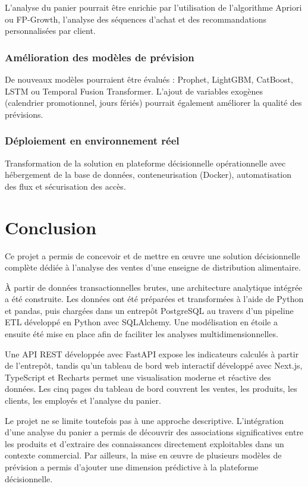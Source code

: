 \documentclass[12pt,a4paper,twoside]{report}
\begin{document}
L'analyse du panier pourrait être enrichie par l'utilisation de l'algorithme Apriori ou FP-Growth, l'analyse des séquences d'achat et des recommandations personnalisées par client.

\subsection{Amélioration des modèles de prévision}

De nouveaux modèles pourraient être évalués : Prophet, LightGBM, CatBoost, LSTM ou Temporal Fusion Transformer. L'ajout de variables exogènes (calendrier promotionnel, jours fériés) pourrait également améliorer la qualité des prévisions.

\subsection{Déploiement en environnement réel}

Transformation de la solution en plateforme décisionnelle opérationnelle avec hébergement de la base de données, conteneurisation (Docker), automatisation des flux et sécurisation des accès.

\chapter{Conclusion}

Ce projet a permis de concevoir et de mettre en œuvre une solution décisionnelle complète dédiée à l'analyse des ventes d'une enseigne de distribution alimentaire.

À partir de données transactionnelles brutes, une architecture analytique intégrée a été construite. Les données ont été préparées et transformées à l'aide de Python et pandas, puis chargées dans un entrepôt PostgreSQL au travers d'un pipeline ETL développé en Python avec SQLAlchemy. Une modélisation en étoile a ensuite été mise en place afin de faciliter les analyses multidimensionnelles.

Une API REST développée avec FastAPI expose les indicateurs calculés à partir de l'entrepôt, tandis qu'un tableau de bord web interactif développé avec Next.js, TypeScript et Recharts permet une visualisation moderne et réactive des données. Les cinq pages du tableau de bord couvrent les ventes, les produits, les clients, les employés et l'analyse du panier.

Le projet ne se limite toutefois pas à une approche descriptive. L'intégration d'une analyse du panier a permis de découvrir des associations significatives entre les produits et d'extraire des connaissances directement exploitables dans un contexte commercial. Par ailleurs, la mise en œuvre de plusieurs modèles de prévision a permis d'ajouter une dimension prédictive à la plateforme décisionnelle.
\end{document}
